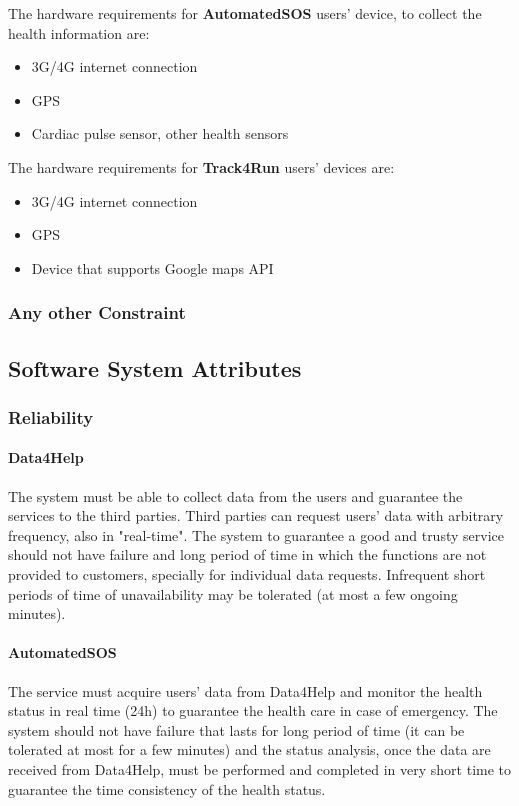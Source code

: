 \documentclass[a4paper]{article}
\begin{document}
\noindent The hardware requirements for \textbf{AutomatedSOS} users' device, to collect the health information are:
    \begin{itemize}
        \item 3G/4G internet connection
        \item GPS
        \item Cardiac pulse sensor, other health sensors
    \end{itemize}
\noindent The hardware requirements for \textbf{Track4Run} users' devices are:
    \begin{itemize}
        \item 3G/4G internet connection
        \item GPS
        \item Device that supports Google maps API
    \end{itemize}
    
    \subsubsection{Any other Constraint}
    
    
    
    \subsection{Software System Attributes}
    
    \subsubsection{Reliability} 
    
    \paragraph{Data4Help} The system must be able to collect data from the users and guarantee the services to the third parties.
    Third parties can request users' data with arbitrary frequency, also in "real-time". The system to guarantee a good and trusty service should not have failure and long period of time in which the functions are not provided to customers, specially for individual data requests. Infrequent short periods of time of unavailability may be tolerated (at most a few ongoing minutes).
    
    \paragraph{AutomatedSOS} The service must acquire users' data from Data4Help and monitor the health status in real time (24h) to guarantee the health care in case of emergency. The system should not have failure that lasts for long period of time (it can be tolerated at most for a few minutes) and the status analysis, once the data are received from Data4Help, must be performed and completed in very short time to guarantee the time consistency of the health status.
    
\end{document}
